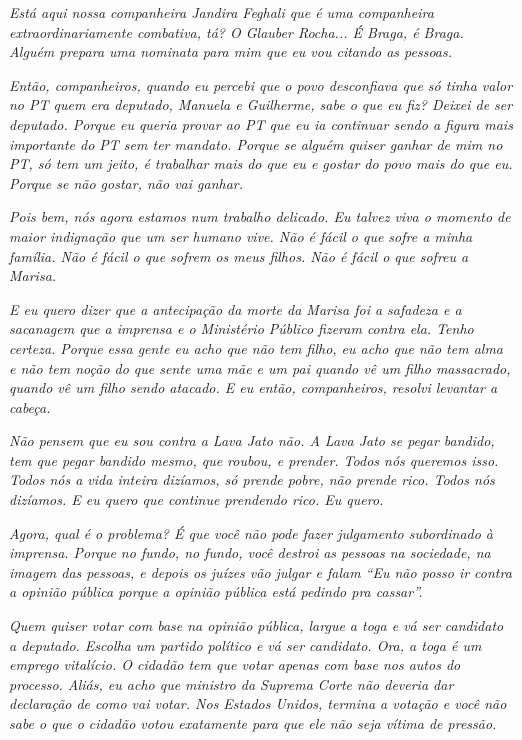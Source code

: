 \emph{Está aqui nossa companheira Jandira Feghali que é uma companheira
extraordinariamente combativa, tá? O Glauber Rocha... É Braga, é Braga.
Alguém prepara uma nominata para mim que eu vou citando as pessoas.~}

\emph{Então, companheiros, quando eu percebi que o povo desconfiava que
só tinha valor no PT quem era deputado, Manuela e Guilherme, sabe o que
eu fiz? Deixei de ser deputado. Porque eu queria provar ao PT que eu ia
continuar sendo a figura mais importante do PT sem ter mandato. Porque
se alguém quiser ganhar de mim no PT, só tem um jeito, é trabalhar mais
do que eu e gostar do povo mais do que eu. Porque se não gostar, não vai
ganhar.~}

\emph{Pois bem, nós agora estamos num trabalho delicado. Eu talvez viva
o momento de maior indignação que um ser humano vive. Não é fácil o que
sofre a minha família. Não é fácil o que sofrem os meus filhos. Não é
fácil o que sofreu a Marisa.}

\emph{E eu quero dizer que a antecipação da morte da Marisa foi a
safadeza e a sacanagem que a imprensa e o Ministério Público fizeram
contra ela. Tenho certeza. Porque essa gente eu acho que não tem filho,
eu acho que não tem alma e não tem noção do que sente uma mãe e um pai
quando vê um filho massacrado, quando vê um filho sendo atacado. E eu
então, companheiros, resolvi levantar a cabeça.~}

\emph{Não pensem que eu sou contra a Lava Jato não. A Lava Jato se pegar
bandido, tem que pegar bandido mesmo, que roubou, e prender. Todos nós
queremos isso. Todos nós a vida inteira dizíamos, só prende pobre, não
prende rico. Todos nós dizíamos. E eu quero que continue prendendo rico.
Eu quero.}

\emph{Agora, qual é o problema? É que você não pode fazer julgamento
subordinado à imprensa. Porque no fundo, no fundo, você destroi as
pessoas na sociedade, na imagem das pessoas, e depois os juízes vão
julgar e falam ``Eu não posso ir contra a opinião pública porque a
opinião pública está pedindo pra cassar''.}

\emph{Quem quiser votar com base na opinião pública, largue a toga e vá
ser candidato a deputado. Escolha um partido político e vá ser
candidato. Ora, a toga é um emprego vitalício. O cidadão tem que votar
apenas com base nos autos do processo. Aliás, eu acho que ministro da
Suprema Corte não deveria dar declaração de como vai votar. Nos Estados
Unidos, termina a votação e você não sabe o que o cidadão votou
exatamente para que ele não seja vítima de pressão.~}

